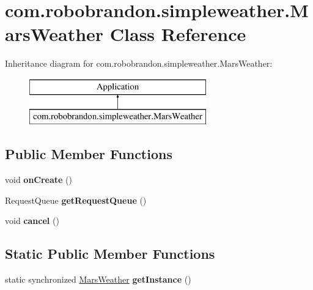 \hypertarget{classcom_1_1robobrandon_1_1simpleweather_1_1_mars_weather}{}\section{com.\+robobrandon.\+simpleweather.\+Mars\+Weather Class Reference}
\label{classcom_1_1robobrandon_1_1simpleweather_1_1_mars_weather}
Inheritance diagram for com.\+robobrandon.\+simpleweather.\+Mars\+Weather\+:\begin{figure}[H]
\begin{center}
\leavevmode
\includegraphics[height=2.000000cm]{classcom_1_1robobrandon_1_1simpleweather_1_1_mars_weather}
\end{center}
\end{figure}
\subsection*{Public Member Functions}
\begin{DoxyCompactItemize}
\item 
void {\bfseries on\+Create} ()\hypertarget{classcom_1_1robobrandon_1_1simpleweather_1_1_mars_weather_a0c6334dcaae58178038d9fe037325ae7}{}\label{classcom_1_1robobrandon_1_1simpleweather_1_1_mars_weather_a0c6334dcaae58178038d9fe037325ae7}

\item 
Request\+Queue {\bfseries get\+Request\+Queue} ()\hypertarget{classcom_1_1robobrandon_1_1simpleweather_1_1_mars_weather_af8ff856ba1e4b44c9b292669d4ea6f9d}{}\label{classcom_1_1robobrandon_1_1simpleweather_1_1_mars_weather_af8ff856ba1e4b44c9b292669d4ea6f9d}

\item 
void {\bfseries cancel} ()\hypertarget{classcom_1_1robobrandon_1_1simpleweather_1_1_mars_weather_a9b4aa89d28bf8de04876a1938b86b90f}{}\label{classcom_1_1robobrandon_1_1simpleweather_1_1_mars_weather_a9b4aa89d28bf8de04876a1938b86b90f}

\end{DoxyCompactItemize}
\subsection*{Static Public Member Functions}
\begin{DoxyCompactItemize}
\item 
static synchronized \hyperlink{classcom_1_1robobrandon_1_1simpleweather_1_1_mars_weather}{Mars\+Weather} {\bfseries get\+Instance} ()\hypertarget{classcom_1_1robobrandon_1_1simpleweather_1_1_mars_weather_ab21589de4970887e59e40c07e128dff9}{}\label{classcom_1_1robobrandon_1_1simpleweather_1_1_mars_weather_ab21589de4970887e59e40c07e128dff9}

\end{DoxyCompactItemize}
